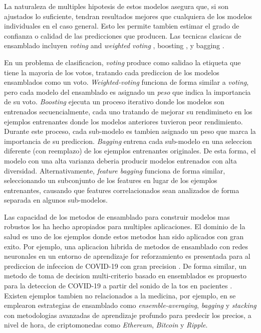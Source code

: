 La naturaleza de multiples hipotesis de estos modelos asegura que, si son ajustados lo suficiente, tendran resultados mejores que cualquiera de los modelos individuales en el caso general. Esto les permite tambien estimar el grado de confianza o calidad de las predicciones que producen. Las tecnicas clasicas de ensamblado incluyen \textit{voting} and \textit{weighted voting} \cite{dietterich2000ensemble}, boosting \cite{schapire1990strength}, y bagging \cite{breiman1996bagging}.

En un problema de clasificacion, \textit{voting} produce como salidao la etiqueta que tiene la mayoria de los votos, tratando cada prediccion de los modelos ensamblados como un voto. \textit{Weighted-voting} funciona de forma similar a \textit{voting}, pero cada modelo del ensamblado es asignado un \textit{peso} que indica la importancia de su voto. \textit{Boosting} ejecuta un proceso iterativo donde los modelos son entrenados secuencialmente, cada uno tratando de mejorar su rendimineto en los ejemplos entrenantes donde los modelos anteriores tuvieron peor rendimiento. Durante este proceso, cada sub-modelo es tambien asignado un peso que marca la importancia de su prediccion. \textit{Bagging} entrena cada sub-modelo en una seleccion diferente (con reemplazo) de los ejemplos entrenantes originales. De esta forma, el modelo con una alta varianza deberia producir modelos entrenados con alta diversidad. Alternativamente, \textit{feature bagging} funciona de forma similar, seleccionando un subconjunto de los features en lugar de los ejemplos entrenantes, causando que features correlacionados sean analizados de forma separada en algunos sub-modelos.

Las capacidad de los metodos de ensamblado para construir modelos mas robustos los ha hecho apropiados para multiples aplicaciones. El dominio de la salud es uno de los ejemplos donde estos metodos han sido aplicados con gran exito. Por ejemplo, una aplicacion hibrida de metodos de ensamblado con redes neuronales en un entorno de aprendizaje for reforzamiento es presentada para al prediccion de infeccion de COVID-19 con gran precision \cite{JIN2022105560}. De forma similar, un metodo de toma de decision multi-criterio basado en ensemblados es propuesto para la deteccion de COVID-19 a partir del sonido de la tos en pacientes \cite{CHOWDHURY2022105405}. Existen ejemplos tambien no relacionados a la medicina, por ejemplo, en \cite{livieris2020ensemble} se emplearon estrategias de ensamblado como \textit{ensemble-averaging}, \textit{bagging} y \textit{stacking} con metodologias avanzadas de aprendizaje profundo para predecir los precios, a nivel de hora, de criptomonedas como \textit{Ethereum}, \textit{Bitcoin} y \textit{Ripple}.

